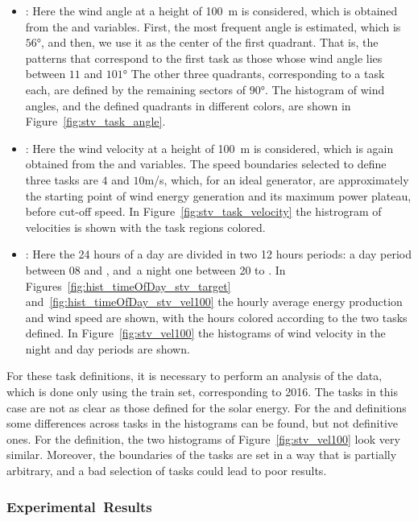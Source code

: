 \begin{itemize}
    \item {}: Here the wind angle at a height of \si{100\metre} is considered, which is obtained from the  and  variables. 
    First, the most frequent angle is estimated, which is $\ang{56}$, and then, we use it as the center of the first quadrant. That is, the patterns that correspond to the first task as those whose wind angle lies between ${11}$ and $\ang{101}$  The other three quadrants, corresponding to a task each, are defined by the remaining sectors of $\ang{90}$.
    The histogram of wind angles, and the defined quadrants in different colors, are shown in Figure~\ref{fig:stv_task_angle}.
    \item {}: Here the wind velocity at a height of \si{100\metre} is considered, which is again obtained from the  and  variables. The speed boundaries selected to define three tasks are $4$ and $10$m/s, which, for an ideal generator, are approximately the starting point of wind energy generation and its maximum power plateau, before cut-off speed.   
    In Figure~\ref{fig:stv_task_velocity} the histrogram of velocities is shown with the task regions colored. 
    \item {}: Here the 24 hours of a day are divided in two 12 hours periods: a day period between 08 and , and~a night one between 20 to .
    In Figures~\ref{fig:hist_timeOfDay_stv_target} and~\ref{fig:hist_timeOfDay_stv_vel100} the hourly average energy production and wind speed are shown, with the hours colored according to the two tasks defined. In Figure~\ref{fig:stv_vel100} the histograms of wind velocity in the night and day periods are shown.
\end{itemize}
%
For these task definitions, it is necessary to perform an analysis of the data, which is done only using the train set, corresponding to 2016.
The tasks in this case are not as clear as those defined for the solar energy. For the  and  definitions some differences across tasks in the histograms can be found, but not definitive ones.
For the  definition, the two histograms of Figure~\ref{fig:stv_vel100} look very similar.
Moreover, the boundaries of the tasks are set in a way that is partially arbitrary, and a bad selection of tasks could lead to poor results.


\subsubsection*{Experimental~Results}


